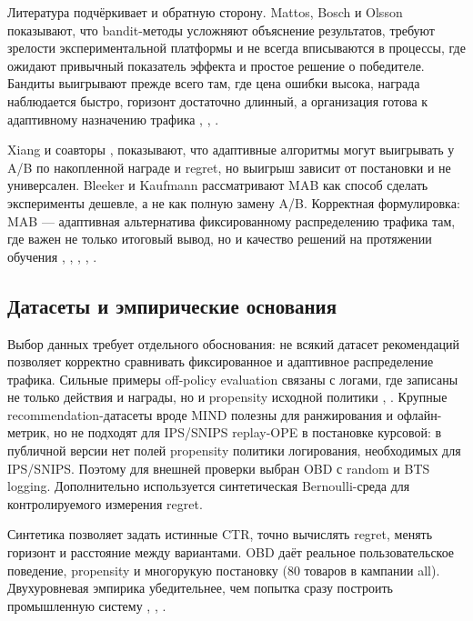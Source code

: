 Литература подчёркивает и обратную сторону. Mattos, Bosch и Olsson \cite{ref18} показывают, что bandit-методы усложняют объяснение результатов, требуют зрелости экспериментальной платформы и не всегда вписываются в процессы, где ожидают привычный показатель эффекта и простое решение о победителе. Бандиты выигрывают прежде всего там, где цена ошибки высока, награда наблюдается быстро, горизонт достаточно длинный, а организация готова к адаптивному назначению трафика \cite{ref12}, \cite{ref13}, \cite{ref18}.

Xiang и соавторы \cite{ref21}, \cite{ref22} показывают, что адаптивные алгоритмы могут выигрывать у A/B по накопленной награде и regret, но выигрыш зависит от постановки и не универсален. Bleeker и Kaufmann \cite{ref22} рассматривают MAB как способ сделать эксперименты дешевле, а не как полную замену A/B. Корректная формулировка: MAB --- адаптивная альтернатива фиксированному распределению трафика там, где важен не только итоговый вывод, но и качество решений на протяжении обучения \cite{ref12}, \cite{ref13}, \cite{ref18}, \cite{ref21}, \cite{ref22}.

\subsection{Датасеты и эмпирические основания}\label{ux434ux430ux442ux430ux441ux435ux442ux44b-ux438-ux44dux43cux43fux438ux440ux438ux447ux435ux441ux43aux438ux435-ux43eux441ux43dux43eux432ux430ux43dux438ux44f}

Выбор данных требует отдельного обоснования: не всякий датасет рекомендаций позволяет корректно сравнивать фиксированное и адаптивное распределение трафика. Сильные примеры off-policy evaluation связаны с логами, где записаны не только действия и награды, но и propensity исходной политики \cite{ref6}, \cite{ref24}. Крупные recommendation-датасеты вроде MIND \cite{ref25} полезны для ранжирования и офлайн-метрик, но не подходят для IPS/SNIPS replay-OPE в постановке курсовой: в публичной версии нет полей propensity политики логирования, необходимых для IPS/SNIPS. Поэтому для внешней проверки выбран OBD \cite{ref26} с random и BTS logging. Дополнительно используется синтетическая Bernoulli-среда для контролируемого измерения regret.

Синтетика позволяет задать истинные CTR, точно вычислять regret, менять горизонт и расстояние между вариантами. OBD даёт реальное пользовательское поведение, propensity и многорукую постановку (80 товаров в кампании all). Двухуровневая эмпирика убедительнее, чем попытка сразу построить промышленную систему \cite{ref17}, \cite{ref21}, \cite{ref24}.

